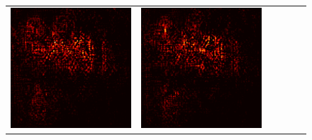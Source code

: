 \documentclass[preprint,12pt]{elsarticle}
\begin{document}
\begin{figure}[p]
\begin{tabular}{cccccc}
  \includegraphics[scale=\scale]{../visualizations/examples/imagenette/resnet18/active_saliency_map/5.png} & 
  \includegraphics[scale=\scale]{../visualizations/examples/imagenette/resnet18/inactive_saliency_map/5.png} \\
  

\end{tabular}
\end{figure}
\end{document}
